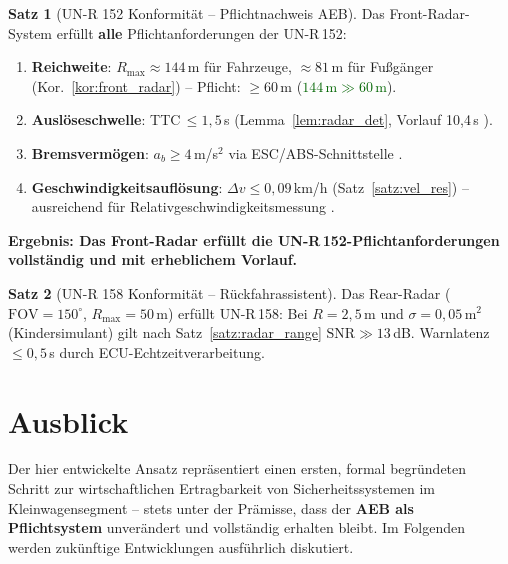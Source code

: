 \documentclass[a4paper,12pt]{article}
\theoremstyle{definition}
\newtheorem{satz}{Satz}
\begin{document}
\begin{satz}[UN-R 152 Konformit\"at -- Pflichtnachweis AEB]
\label{satz:unr152}
Das Front-Radar-System erf\"ullt \textbf{alle} Pflichtanforderungen
der UN-R\,152:
\begin{enumerate}
  \item \textbf{Reichweite}: $R_{\max}\approx144$\,m f\"ur Fahrzeuge,
        $\approx81$\,m f\"ur Fu\ss{}g\"anger
        (Kor.~\ref{kor:front_radar}) -- Pflicht: $\ge60$\,m
        (\textcolor{darkgreen}{$144\,\text{m} \gg 60\,\text{m}$\;\checkmark}).
  \item \textbf{Ausl\"oseschwelle}: TTC\,$\le1{,}5$\,s
        (Lemma~\ref{lem:radar_det}, Vorlauf 10,4\,s
        \textcolor{darkgreen}{\checkmark}).
  \item \textbf{Bremsverm\"ogen}: $a_b\ge4$\,m/s$^2$ via
        ESC/ABS-Schnittstelle \textcolor{darkgreen}{\checkmark}.
  \item \textbf{Geschwindigkeitsaufl\"osung}: $\Delta v\le0{,}09$\,km/h
        (Satz~\ref{satz:vel_res}) -- ausreichend f\"ur
        Relativgeschwindigkeitsmessung \textcolor{darkgreen}{\checkmark}.
\end{enumerate}
\textcolor{accentred}{\textbf{Ergebnis: Das Front-Radar erf\"ullt die
UN-R\,152-Pflichtanforderungen vollst\"andig und mit erheblichem Vorlauf.}}
\end{satz}

\begin{satz}[UN-R 158 Konformit\"at -- R\"uckfahrassistent]
Das Rear-Radar ($\mathrm{FOV}=150^\circ$, $R_{\max}=50$\,m) erf\"ullt
UN-R\,158: Bei $R=2{,}5$\,m und $\sigma=0{,}05$\,m$^2$ (Kindersimulant)
gilt nach Satz~\ref{satz:radar_range} $\mathrm{SNR}\gg13$\,dB.
Warnlatenz $\le0{,}5$\,s durch ECU-Echtzeitverarbeitung.
\textcolor{darkgreen}{\checkmark}
\end{satz}

\section{Ausblick}
\label{sec:ausblick}

Der hier entwickelte Ansatz repr\"asentiert einen ersten, formal
begr\"undeten Schritt zur wirtschaftlichen Ertragbarkeit von
Sicherheitssystemen im Kleinwagensegment -- stets unter der Pr\"amisse,
dass der \textbf{AEB als Pflichtsystem} unver\"andert und vollst\"andig
erhalten bleibt. Im Folgenden werden zuk\"unftige Entwicklungen
ausf\"uhrlich diskutiert.
\end{document}
